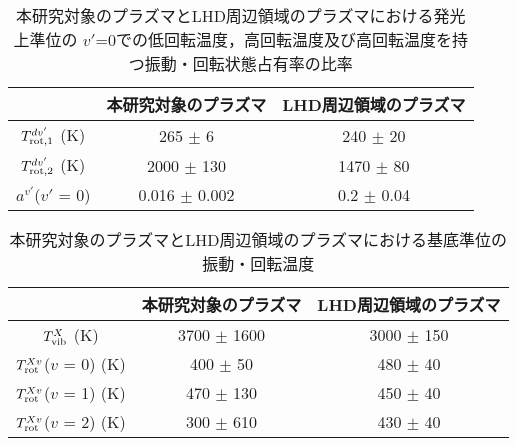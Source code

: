 \begin{table}
    \caption{本研究対象のプラズマとLHD周辺領域のプラズマ\cite{ishihara}における発光上準位の
    $v'$=0での低回転温度，高回転温度及び高回転温度を持つ振動・回転状態占有率の比率}
    \label{table:two-result-table}
    \centering
    \begin{tabular}{ccc}
        \hline
         & 本研究対象のプラズマ & LHD周辺領域のプラズマ\\
        \hline
        $T^{dv'}_{\rm rot,1}$ (K)& 265 $\pm$ 6 & 240 $\pm$ 20 \\
        $T^{dv'}_{\rm rot,2}$ (K)& 2000 $\pm$ 130 & 1470 $\pm$ 80 \\
        $a^{v'}$($v'$ = 0) & 0.016 $\pm$ 0.002 & 0.2 $\pm$ 0.04\\
        \hline
    \end{tabular}
\end{table}

\begin{table}
    \caption{本研究対象のプラズマとLHD周辺領域のプラズマ\cite{ishihara}における基底準位の振動・回転温度}
    \label{table:ground-result-compare}
    \centering
    \begin{tabular}{ccc}
        \hline
        & 本研究対象のプラズマ & LHD周辺領域のプラズマ\\
        \hline
        $T^X_{\rm vib}$ (K)& 3700 $\pm$ 1600 & 3000 $\pm$ 150\\
        $T^{Xv}_{\rm rot}$($v$ = 0) (K)& 400 $\pm$ 50 & 480 $\pm$ 40\\
        $T^{Xv}_{\rm rot}$($v$ = 1) (K)& 470 $\pm$ 130 & 450 $\pm$ 40\\
        $T^{Xv}_{\rm rot}$($v$ = 2) (K)& 300 $\pm$ 610 & 430 $\pm$ 40\\
        \hline
    \end{tabular}
\end{table}
